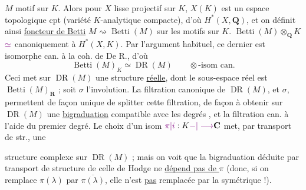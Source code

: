 $M$ motif sur $K$. Alors  pour  $X$ lisse projectif sur $K$, $X(K)$ est un espace topologique cpt (variété $K$-analytique compacte), d'où $H^*(X,\mathbf Q)$, et on définit ainsi \uline{foncteur de Betti} $M\rightsquigarrow\operatorname{Betti}(M)$ sur les motifs sur $K$. $\operatorname{Betti}(M)\otimes_{\mathbf Q}K$ $\unsure{\simeq}$ canoniquement à $H^*(X,K)$. Par l'argument habituel, ce dernier est isomorphe can. à la coh. de De R., d'où
\[
\operatorname{Betti}(M)_K\simeq\operatorname{DR}(M)
\qquad\otimes\text{-isom can.}
\]
Ceci met sur  $\operatorname{DR}(M)$ une structure \uline{réelle}, dont le sous-espace réel est $\operatorname{Betti}(M)_{\mathbf R}$ ; soit $\sigma$ l'involution. La filtration canonique de $\operatorname{DR}(M)$, et $\sigma$, permettent de façon unique de splitter cette filtration, de façon à obtenir sur $\operatorname{DR}(M)$ une \uline{bigraduation} compatible avec les degrés , et  la filtration can. à l'aide du premier degré. Le choix d'un isom $\unsure{\pi|i}:K\unsure{-|\longrightarrow}\mathbf C$ met, par transport de str., une


structure  complexe sur $\operatorname{DR}(M)$ ; mais on voit que la bigraduation déduite par transport de structure de celle de Hodge ne \uline{dépend pas de $\pi$} (donc, si on remplace $\pi(\lambda)$ par $\overline{\pi(\lambda)}$, elle n'est \uline{pas} remplacée par la symétrique !).



